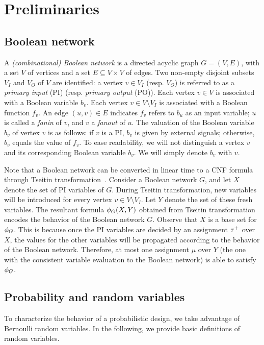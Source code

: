 \section{Preliminaries}
\label{sect:prob-preliminaries}

\subsection{Boolean network}
\label{sect:prob-preliminaries-boolean-network}

A \textit{(combinational) Boolean network} is a directed acyclic graph $G=(V,E)$,
with a set $V$ of vertices and a set $E\subseteq V \times V$ of edges.
Two non-empty disjoint subsets $V_I$ and $V_O$ of $V$ are identified:
a vertex $v \in V_I$ (resp. $V_O$) is referred to as a \textit{primary input} (PI) (resp. \textit{primary output} (PO)).
Each vertex $v \in V$ is associated with a Boolean variable $b_v$.
Each vertex $v \in V \setminus V_I$ is associated with a Boolean function $f_v$.
An edge $(u,v)\in E$ indicates $f_v$ refers to $b_u$ as an input variable;
$u$ is called a \textit{fanin} of $v$, and $v$ a \textit{fanout} of $u$.
The valuation of the Boolean variable $b_v$ of vertex $v$ is as follows:
if $v$ is a PI, $b_v$ is given by external signals; otherwise, $b_v$ equals the value of $f_v$.
To ease readability, we will not distinguish a vertex $v$ and its corresponding Boolean variable $b_v$.
We will simply denote $b_v$ with $v$.

Note that a Boolean network can be converted in linear time to a CNF formula through Tseitin transformation~\cite{Tseitin1983}.
Consider a Boolean network $G$,
and let $X$ denote the set of PI variables of $G$.
During Tseitin transformation,
new variables will be introduced for every vertex $v\in V\setminus V_I$.
Let $Y$ denote the set of these fresh variables.
The resultant formula $\phi_G(X,Y)$ obtained from Tseitin transformation encodes the behavior of the Boolean network $G$.
Observe that $X$ is a base set for $\phi_G$.
This is because once the PI variables are decided by an assignment $\tau^+$ over $X$,
the values for the other variables will be propagated according to the behavior of the Boolean network.
Therefore, at most one assignment $\mu$ over $Y$ (the one with the consistent variable evaluation to the Boolean network) is able to satisfy $\phi_G$.

\subsection{Probability and random variables}
\label{sect:prob-preliminaries-random-variable}
To characterize the behavior of a probabilistic design,
we take advantage of Bernoulli random variables.
In the following, we provide basic definitions of random variables.

